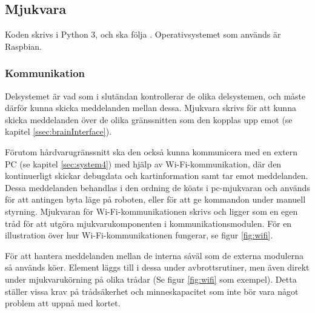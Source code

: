 \documentclass[a4paper,11pt]{article}
\begin{document}
\begin{HardwareList}
\end{HardwareList}

\subsection{Mjukvara}
Koden skrivs i Python 3, och ska följa \cite{pep8}. Operativsystemet som används är Raspbian.

\subsubsection{Kommunikation}
Delsystemet är vad som i slutändan kontrollerar de olika delsystemen, och måste därför kunna skicka meddelanden mellan dessa. Mjukvara skrivs för att kunna skicka meddelanden över de olika gränssnitten som den kopplas upp emot (se kapitel \ref{ssec:brainInterface}).

Förutom hårdvarugränssnitt ska den också kunna kommunicera med en extern PC (se kapitel \ref{sec:system4}) med hjälp av Wi-Fi-kommunikation, där den kontinuerligt skickar debugdata och kartinformation samt tar emot meddelanden. Dessa meddelanden behandlas i den ordning de köats i pc-mjukvaran och används för att antingen byta läge på roboten, eller för att ge kommandon under manuell styrning. Mjukvaran för Wi-Fi-kommunikationen skrivs och ligger som en egen tråd för att utgöra mjukvarukomponenten i kommunikationsmodulen. För en illustration över hur Wi-Fi-kommunikationen fungerar, se figur \ref{fig:wifi}.

För att hantera meddelanden mellan de interna såväl som de externa modulerna så används köer. Element läggs till i dessa under avbrottsrutiner, men även direkt under mjukvarukörning på olika trådar (Se figur \ref{fig:wifi} som exempel). Detta ställer vissa krav på trådsäkerhet och minneskapacitet som inte bör vara något problem att uppnå med kortet.
\end{document}
